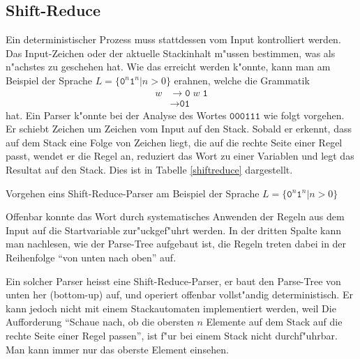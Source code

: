 \subsection{Shift-Reduce}
Ein deterministischer Prozess muss stattdessen vom Input kontrolliert werden.
Das Input-Zeichen oder der aktuelle Stackinhalt m"ussen bestimmen, was
als n"achstes zu geschehen hat. Wie das erreicht werden k"onnte, kann man am
Beispiel der Sprache $L=\{\texttt{0}^n\texttt{1}^n|n> 0\}$ erahnen, welche die
Grammatik
\begin{align}
w&\rightarrow \texttt{0}\;w\;\texttt{1}\tag{1}\\
&\rightarrow \texttt{01}\tag{2}
\end{align}
hat. Ein Parser k"onnte bei der Analyse des Wortes $\texttt{000111}$ wie folgt vorgehen.
Er schiebt Zeichen um Zeichen vom Input auf den Stack. Sobald
er erkennt, dass auf dem Stack eine Folge von Zeichen liegt, die auf die rechte
Seite einer Regel passt, wendet er die Regel an, reduziert das Wort zu einer
Variablen und legt das Resultat auf den Stack. Dies ist in Tabelle \ref{shiftreduce}
dargestellt.

\begin{table}[H]

\caption{Vorgehen eins Shift-Reduce-Parser am Beispiel der Sprache $L=\{\texttt{0}^n\texttt{1}^n|n>0\}$
\label{shiftreduce}}
\end{table}
Offenbar konnte das Wort durch systematisches Anwenden der Regeln aus dem Input
auf die Startvariable zur"uckgef"uhrt werden.
In der dritten Spalte kann man nachlesen, wie der Parse-Tree aufgebaut ist,
die Regeln treten dabei in der Reihenfolge ``von unten nach oben'' auf.

Ein solcher Parser heisst eine Shift-Reduce-Parser, er baut den Parse-Tree von unten
her (bottom-up) auf, und operiert offenbar vollst"andig deterministisch.
Er kann jedoch nicht mit einem Stackautomaten implementiert werden,
weil Die Aufforderung ``Schaue nach, ob die obersten $n$ Elemente auf dem Stack
auf die rechte Seite einer Regel passen'', ist f"ur bei einem Stack nicht
durchf"uhrbar. Man kann immer nur das oberste Element einsehen.

